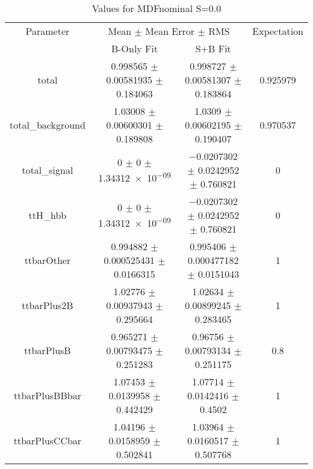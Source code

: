 \begin{table}
\centering
\caption{Values for MDFnominal S=0.0}
\begin{tabular}{cccc}
\toprule
Parameter & \multicolumn{2}{c}{Mean $\pm$ Mean Error $\pm$ RMS} & Expectation\\
 & B-Only Fit & S+B Fit & \\
\midrule
total & \num{0.998565} $\pm$ \num{0.00581935} $\pm$ \num{0.184063} & \num{0.998727} $\pm$ \num{0.00581307} $\pm$ \num{0.183864} & \num{0.925979}\\
total\_background & \num{1.03008} $\pm$ \num{0.00600301} $\pm$ \num{0.189808} & \num{1.0309} $\pm$ \num{0.00602195} $\pm$ \num{0.190407} & \num{0.970537}\\
total\_signal & \num{0} $\pm$ \num{0} $\pm$ \num{1.34312e-09} & \num{-0.0207302} $\pm$ \num{0.0242952} $\pm$ \num{0.760821} & \num{0}\\
ttH\_hbb & \num{0} $\pm$ \num{0} $\pm$ \num{1.34312e-09} & \num{-0.0207302} $\pm$ \num{0.0242952} $\pm$ \num{0.760821} & \num{0}\\
ttbarOther & \num{0.994882} $\pm$ \num{0.000525431} $\pm$ \num{0.0166315} & \num{0.995406} $\pm$ \num{0.000477182} $\pm$ \num{0.0151043} & \num{1}\\
ttbarPlus2B & \num{1.02776} $\pm$ \num{0.00937943} $\pm$ \num{0.295664} & \num{1.02634} $\pm$ \num{0.00899245} $\pm$ \num{0.283465} & \num{1}\\
ttbarPlusB & \num{0.965271} $\pm$ \num{0.00793475} $\pm$ \num{0.251283} & \num{0.96756} $\pm$ \num{0.00793134} $\pm$ \num{0.251175} & \num{0.8}\\
ttbarPlusBBbar & \num{1.07453} $\pm$ \num{0.0139958} $\pm$ \num{0.442429} & \num{1.07714} $\pm$ \num{0.0142416} $\pm$ \num{0.4502} & \num{1}\\
ttbarPlusCCbar & \num{1.04196} $\pm$ \num{0.0158959} $\pm$ \num{0.502841} & \num{1.03964} $\pm$ \num{0.0160517} $\pm$ \num{0.507768} & \num{1}\\
\bottomrule
\end{tabular}
\end{table}